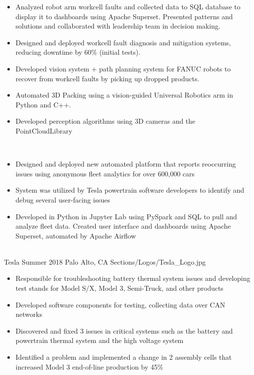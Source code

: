     \begin{itemize}
        \item Analyzed robot arm workcell faults and collected data to SQL database to display it to dashboards using Apache Superset. Presented patterns and solutions and collaborated with leadership team in decision making.
        \item Designed and deployed workcell fault diagnosis and mitigation systems, reducing downtime by 60\% (initial tests).
        \item Developed vision system + path planning system for FANUC robots to recover from workcell faults by picking up dropped products.
    \end{itemize}
\divider
{}
    \begin{itemize}
        \item Automated 3D Packing using a vision-guided Universal Robotics arm in Python and C++.
        \item Developed perception algorithms using 3D cameras and the PointCloudLibrary
    \end{itemize}
\divider \\
    \begin{itemize}
        \item Designed and deployed new automated platform that reports reoccurring issues using anonymous fleet analytics for over 600,000 cars
        \item System was utilized by Tesla powertrain software developers to identify and debug several user-facing issues
        \item Developed in Python in Jupyter Lab using PySpark and SQL to pull and analyze fleet data. Created user interface and dashboards using Apache Superset, automated by Apache Airflow
    \end{itemize}
\divider \\
    {Tesla}
    {Summer 2018}
    {Palo Alto, CA}
    {Sections/Logos/Tesla_Logo.jpg}
    \begin{itemize}
        \item Responsible for troubleshooting battery thermal system issues and developing test stands for Model S/X, Model 3, Semi-Truck, and other products
        \item Developed software components for testing, collecting data over CAN networks
        \item Discovered and fixed 3 issues in critical systems such as the battery and powertrain thermal system and the high voltage system
        \item Identified a problem and implemented a change in 2 assembly cells that increased Model 3 end-of-line production by 45\%
    \end{itemize}

